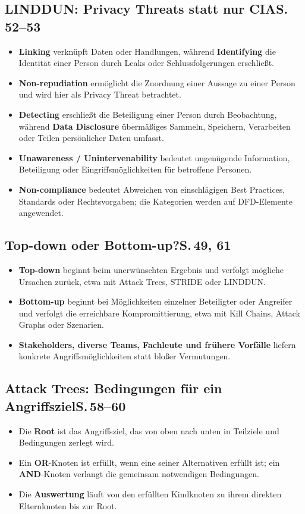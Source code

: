 \documentclass[11pt,a4paper]{article}
\newcommand{\block}[2]{\subsection*{#1\hfill{\normalfont\small #2}}}
\begin{document}
\block{LINDDUN: Privacy Threats statt nur CIA}{S.\,52--53}
\begin{itemize}
\item \textbf{Linking} verknüpft Daten oder Handlungen, während \textbf{Identifying} die Identität einer Person durch Leaks oder Schlussfolgerungen erschließt.
\item \textbf{Non-repudiation} ermöglicht die Zuordnung einer Aussage zu einer Person und wird hier als Privacy Threat betrachtet.
\item \textbf{Detecting} erschließt die Beteiligung einer Person durch Beobachtung, während \textbf{Data Disclosure} übermäßiges Sammeln, Speichern, Verarbeiten oder Teilen persönlicher Daten umfasst.
\item \textbf{Unawareness / Unintervenability} bedeutet ungenügende Information, Beteiligung oder Eingriffsmöglichkeiten für betroffene Personen.
\item \textbf{Non-compliance} bedeutet Abweichen von einschlägigen Best Practices, Standards oder Rechtsvorgaben; die Kategorien werden auf DFD-Elemente angewendet.
\end{itemize}

\block{Top-down oder Bottom-up?}{S.\,49, 61}
\begin{itemize}
\item \textbf{Top-down} beginnt beim unerwünschten Ergebnis und verfolgt mögliche Ursachen zurück, etwa mit Attack Trees, STRIDE oder LINDDUN.
\item \textbf{Bottom-up} beginnt bei Möglichkeiten einzelner Beteiligter oder Angreifer und verfolgt die erreichbare Kompromittierung, etwa mit Kill Chains, Attack Graphs oder Szenarien.
\item \textbf{Stakeholders, diverse Teams, Fachleute und frühere Vorfälle} liefern konkrete Angriffsmöglichkeiten statt bloßer Vermutungen.
\end{itemize}

\newpage
\block{Attack Trees: Bedingungen für ein Angriffsziel}{S.\,58--60}
\begin{itemize}
\item Die \textbf{Root} ist das Angriffsziel, das von oben nach unten in Teilziele und Bedingungen zerlegt wird.
\item Ein \textbf{OR}-Knoten ist erfüllt, wenn eine seiner Alternativen erfüllt ist; ein \textbf{AND}-Knoten verlangt die gemeinsam notwendigen Bedingungen.
\item Die \textbf{Auswertung} läuft von den erfüllten Kindknoten zu ihrem direkten Elternknoten bis zur Root.
\end{itemize}
\end{document}
